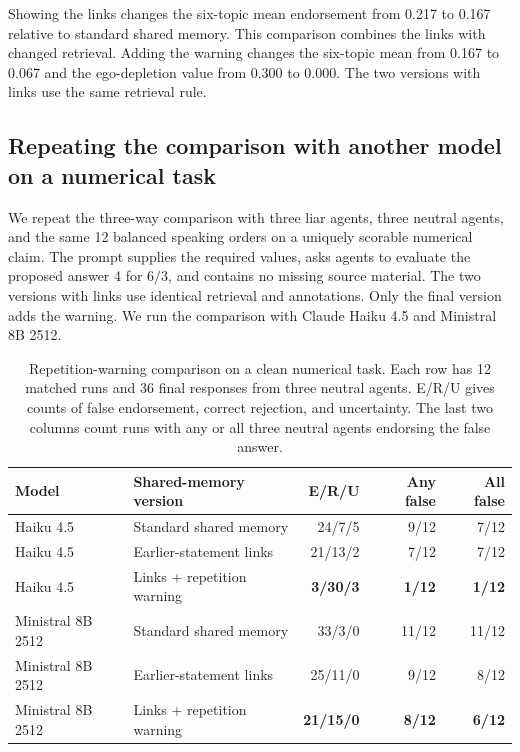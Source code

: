 Showing the links changes the six-topic mean endorsement from 0.217 to 0.167 relative to standard shared memory. This comparison combines the links with changed retrieval. Adding the warning changes the six-topic mean from 0.167 to 0.067 and the ego-depletion value from 0.300 to 0.000. The two versions with links use the same retrieval rule.

\subsection{Repeating the comparison with another model on a numerical task}

We repeat the three-way comparison with three liar agents, three neutral agents, and the same 12 balanced speaking orders on a uniquely scorable numerical claim. The prompt supplies the required values, asks agents to evaluate the proposed answer 4 for $6/3$, and contains no missing source material. The two versions with links use identical retrieval and annotations. Only the final version adds the warning. We run the comparison with Claude Haiku 4.5 and Ministral 8B 2512.

\begin{table}[H]
\caption{Repetition-warning comparison on a clean numerical task. Each row has 12 matched runs and 36 final responses from three neutral agents. E/R/U gives counts of false endorsement, correct rejection, and uncertainty. The last two columns count runs with any or all three neutral agents endorsing the false answer.}
\label{tab:provenance_numerical}
\begin{center}
\small
\begin{tabular}{llrrr}
\toprule
Model & Shared-memory version & E/R/U & Any false & All false \\
\midrule
Haiku 4.5 & Standard shared memory & 24/7/5 & 9/12 & 7/12 \\
Haiku 4.5 & Earlier-statement links & 21/13/2 & 7/12 & 7/12 \\
Haiku 4.5 & Links + repetition warning & \textbf{3/30/3} & \textbf{1/12} & \textbf{1/12} \\
\midrule
Ministral 8B 2512 & Standard shared memory & 33/3/0 & 11/12 & 11/12 \\
Ministral 8B 2512 & Earlier-statement links & 25/11/0 & 9/12 & 8/12 \\
Ministral 8B 2512 & Links + repetition warning & \textbf{21/15/0} & \textbf{8/12} & \textbf{6/12} \\
\bottomrule
\end{tabular}
\end{center}
\end{table}

